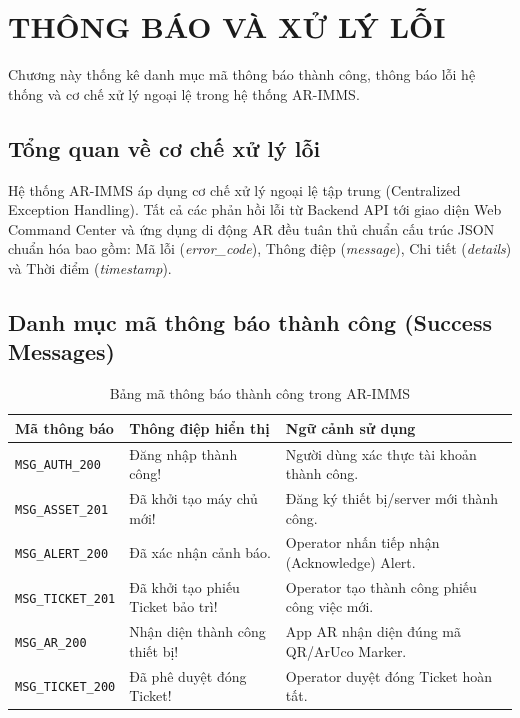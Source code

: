 \chapter{THÔNG BÁO VÀ XỬ LÝ LỖI}

Chương này thống kê danh mục mã thông báo thành công, thông báo lỗi hệ thống và cơ chế xử lý ngoại lệ trong hệ thống AR-IMMS.

\section{Tổng quan về cơ chế xử lý lỗi}
Hệ thống AR-IMMS áp dụng cơ chế xử lý ngoại lệ tập trung (Centralized Exception Handling). Tất cả các phản hồi lỗi từ Backend API tới giao diện Web Command Center và ứng dụng di động AR đều tuân thủ chuẩn cấu trúc JSON chuẩn hóa bao gồm: Mã lỗi (\textit{error\_code}), Thông điệp (\textit{message}), Chi tiết (\textit{details}) và Thời điểm (\textit{timestamp}).

\section{Danh mục mã thông báo thành công (Success Messages)}
\begin{table}[H]
\centering
\begin{tabular}{|p{3cm}|p{5cm}|p{6.5cm}|}
\hline
\textbf{Mã thông báo} & \textbf{Thông điệp hiển thị} & \textbf{Ngữ cảnh sử dụng} \\ \hline
\texttt{MSG\_AUTH\_200} & Đăng nhập thành công! & Người dùng xác thực tài khoản thành công. \\ \hline
\texttt{MSG\_ASSET\_201} & Đã khởi tạo máy chủ mới! & Đăng ký thiết bị/server mới thành công. \\ \hline
\texttt{MSG\_ALERT\_200} & Đã xác nhận cảnh báo. & Operator nhấn tiếp nhận (Acknowledge) Alert. \\ \hline
\texttt{MSG\_TICKET\_201} & Đã khởi tạo phiếu Ticket bảo trì! & Operator tạo thành công phiếu công việc mới. \\ \hline
\texttt{MSG\_AR\_200} & Nhận diện thành công thiết bị! & App AR nhận diện đúng mã QR/ArUco Marker. \\ \hline
\texttt{MSG\_TICKET\_200} & Đã phê duyệt đóng Ticket! & Operator duyệt đóng Ticket hoàn tất. \\ \hline
\end{tabular}
\caption{Bảng mã thông báo thành công trong AR-IMMS}
\end{table}

